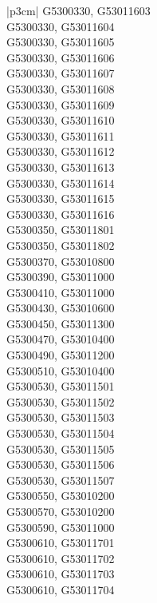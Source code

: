 \begin{customLongTable}{ |p{3cm}| }
G5300330, G53011603 \\ \hline
G5300330, G53011604 \\ \hline
G5300330, G53011605 \\ \hline
G5300330, G53011606 \\ \hline
G5300330, G53011607 \\ \hline
G5300330, G53011608 \\ \hline
G5300330, G53011609 \\ \hline
G5300330, G53011610 \\ \hline
G5300330, G53011611 \\ \hline
G5300330, G53011612 \\ \hline
G5300330, G53011613 \\ \hline
G5300330, G53011614 \\ \hline
G5300330, G53011615 \\ \hline
G5300330, G53011616 \\ \hline
G5300350, G53011801 \\ \hline
G5300350, G53011802 \\ \hline
G5300370, G53010800 \\ \hline
G5300390, G53011000 \\ \hline
G5300410, G53011000 \\ \hline
G5300430, G53010600 \\ \hline
G5300450, G53011300 \\ \hline
G5300470, G53010400 \\ \hline
G5300490, G53011200 \\ \hline
G5300510, G53010400 \\ \hline
G5300530, G53011501 \\ \hline
G5300530, G53011502 \\ \hline
G5300530, G53011503 \\ \hline
G5300530, G53011504 \\ \hline
G5300530, G53011505 \\ \hline
G5300530, G53011506 \\ \hline
G5300530, G53011507 \\ \hline
G5300550, G53010200 \\ \hline
G5300570, G53010200 \\ \hline
G5300590, G53011000 \\ \hline
G5300610, G53011701 \\ \hline
G5300610, G53011702 \\ \hline
G5300610, G53011703 \\ \hline
G5300610, G53011704 \\ \hline

\end{customLongTable}
